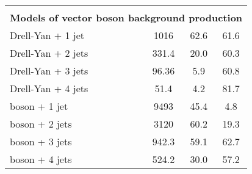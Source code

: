 \begin{table}
{\begin{tabular}{llllccc}
			\vspace*{0.02cm} \\
			\multicolumn{7}{l}{\textbf{Models of vector boson background production}} \\
			\hline 
			\vspace*{0.01cm}
			Drell-Yan + 1 jet 			& \mgamc{}			& \pythia{} &	\CUETold{}	 & 	1016		  &  62.6  & 61.6 \\ 
			Drell-Yan + 2 jets  		& \mgamc{}			& \pythia{} &	\CUETold{}	 & 	331.4		  &  20.0  & 60.3 \\ 
			Drell-Yan + 3 jets  		& \mgamc{}			& \pythia{} &	\CUETold{}	 & 	96.36		  &  5.9   & 60.8 \\ 
			Drell-Yan + 4 jets  		& \mgamc{}			& \pythia{} &	\CUETold{}	 & 	51.4		  &  4.2   & 81.7 \\ 
			\Wboson{} boson + 1 jet 	& \mgamc{}			& \pythia{} &	\CUETold{}	 & 	9493		  &  45.4  & 4.8 \\ 
			\Wboson{} boson + 2 jets 	& \mgamc{}			& \pythia{} &	\CUETold{}	 & 	3120		  &  60.2  & 19.3 \\ 
			\Wboson{} boson + 3 jets 	& \mgamc{}			& \pythia{} &	\CUETold{}	 & 	942.3		  &  59.1  & 62.7 \\ 
			\Wboson{} boson + 4 jets 	& \mgamc{}			& \pythia{} &	\CUETold{}	 & 	524.2		  &  30.0  & 57.2 \\ 


\end{tabular}}
\end{table}
